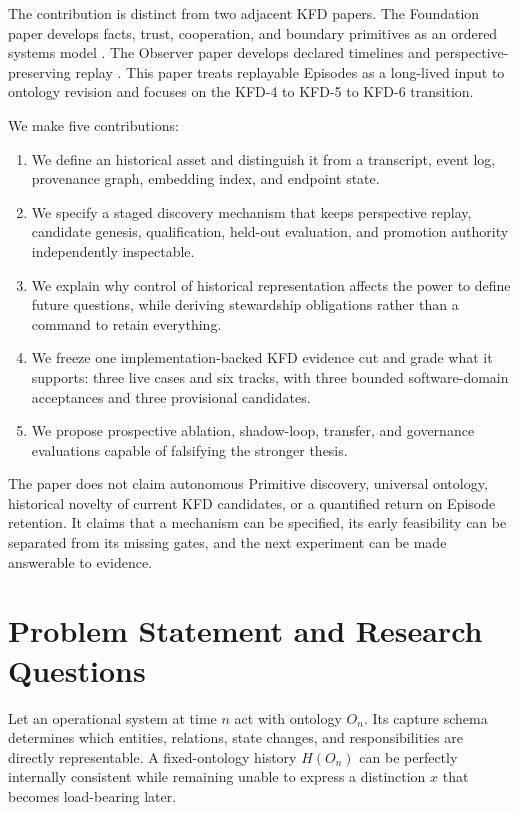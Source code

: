 The contribution is distinct from two adjacent KFD papers. The Foundation
paper develops facts, trust, cooperation, and boundary primitives as an ordered
systems model \cite{kfdFoundationPaper2026}. The Observer paper develops
declared timelines and perspective-preserving replay
\cite{kfdObserverPaper2026}. This paper treats replayable Episodes as a
long-lived input to ontology revision and focuses on the KFD-4 to KFD-5 to
KFD-6 transition.

We make five contributions:

\begin{enumerate}[leftmargin=*]
  \item We define an \episode{} historical asset and distinguish it from a
        transcript, event log, provenance graph, embedding index, and endpoint
        state.
  \item We specify a staged discovery mechanism that keeps perspective replay,
        candidate genesis, qualification, held-out evaluation, and promotion
        authority independently inspectable.
  \item We explain why control of historical representation affects the power
        to define future questions, while deriving stewardship obligations
        rather than a command to retain everything.
  \item We freeze one implementation-backed KFD evidence cut and grade what it
        supports: three live cases and six tracks, with three bounded
        software-domain acceptances and three provisional candidates.
  \item We propose prospective ablation, shadow-loop, transfer, and governance
        evaluations capable of falsifying the stronger thesis.
\end{enumerate}

The paper does not claim autonomous Primitive discovery, universal ontology,
historical novelty of current KFD candidates, or a quantified return on
Episode retention. It claims that a mechanism can be specified, its early
feasibility can be separated from its missing gates, and the next experiment
can be made answerable to evidence.

\section{Problem Statement and Research Questions}
\label{sec:problem}

Let an operational system at time $n$ act with ontology $O_n$. Its capture
schema determines which entities, relations, state changes, and responsibilities
are directly representable. A fixed-ontology history $H(O_n)$ can be perfectly
internally consistent while remaining unable to express a distinction $x$
that becomes load-bearing later.

